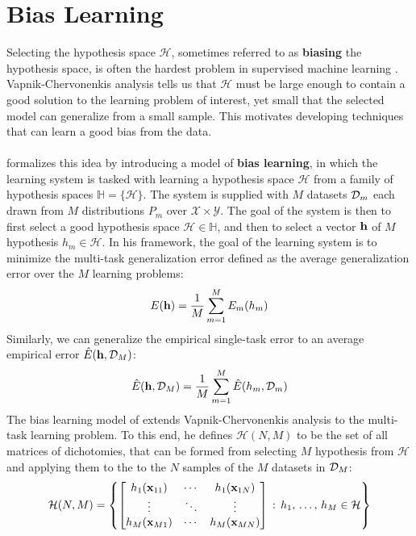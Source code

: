 \section{Bias Learning}
\label{bias_learning}
Selecting the hypothesis space $\mathcal{H}$, sometimes referred to as \textbf{biasing} the hypothesis space, is often the hardest problem in supervised machine learning \citep{baxter2000}. Vapnik-Chervonenkis analysis tells us that $\mathcal{H}$ must be large enough to contain a good solution to the learning problem of interest, yet small that the selected model can generalize from a small sample. This motivates developing techniques that can learn a good bias from the data.
\\\\
\citet{baxter2000} formalizes this idea by introducing a model of \textbf{bias learning}, in which the learning system is tasked with learning a hypothesis space $\mathcal{H}$ from a family of hypothesis spaces $\mathbb{H} = \{\mathcal{H}\}$. The system is supplied with $M$ datasets $\mathcal{D}_m$ each drawn from $M$ distributions $P_m$ over $\mathcal{X} \times \mathcal{Y}$. The goal of the system is then to first select a good hypothesis space $\mathcal{H} \in \mathbb{H}$, and then to select a vector $\mathbf{h}$ of $M$ hypothesis $h_m \in \mathcal{H}$. In his framework, the goal of the learning system is to minimize the multi-task generalization error defined as the average generalization error over the $M$ learning problems:
$$
E(\mathbf{h}) = \frac{1}{M}\sum\limits_{m = 1}^M E_m(h_m)
$$
Similarly, we can generalize the empirical single-task error to an average empirical error $\hat{E}(\mathbf{h}, \mathcal{D}_M)$: 
$$
\hat{E}(\mathbf{h}, \mathcal{D}_M) = \frac{1}{M}\sum\limits_{m = 1}^M\hat{E}(h_m, \mathcal{D}_m)
$$
The bias learning model of \citet{baxter2000} extends Vapnik-Chervonenkis analysis to the multi-task learning problem. To this end, he defines $\mathcal{H}(N, M)$ to be the set of all matrices of dichotomies, that can be formed from selecting $M$ hypothesis from $\mathcal{H}$ and applying them to the to the $N$ samples of the $M$ datasets in $\mathcal{D}_M$:
$$
\mathcal{H}(N, M) = \left\{ \begin{bmatrix}
	h_1(\mathbf{x}_{11}) & \cdots & h_1(\mathbf{x}_{1N}) \\
	\vdots & \ddots & \vdots \\
	h_M(\mathbf{x}_{M1}) & \cdots & h_M(\mathbf{x}_{MN})
\end{bmatrix}\, :\, h_1,\, \dots,\, h_M \in \mathcal{H} \right\}
$$

